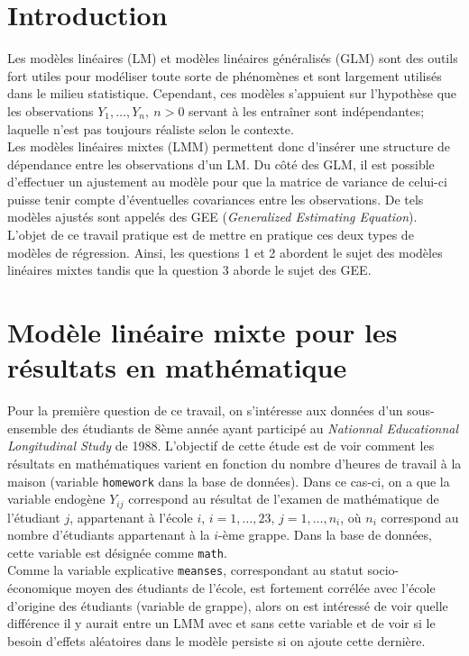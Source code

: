 \documentclass{article}
\begin{document}
\section*{Introduction}
Les modèles linéaires (LM) et modèles linéaires généralisés (GLM) sont des outils fort utiles pour modéliser toute sorte de phénomènes et sont largement utilisés dans le milieu statistique. Cependant, ces modèles s'appuient sur l'hypothèse que les observations $Y_1,\dots,Y_n,\ n>0$ servant à les entraîner sont indépendantes; laquelle n'est pas toujours réaliste selon le contexte.\\

Les modèles linéaires mixtes (LMM) permettent donc d'insérer une structure de dépendance entre les observations d'un LM. Du côté des GLM, il est possible d'effectuer un ajustement au modèle pour que la matrice de variance de celui-ci puisse tenir compte d'éventuelles covariances entre les observations. De tels modèles ajustés sont appelés des GEE (\textit{Generalized Estimating Equation}).\\

L'objet de ce travail pratique est de mettre en pratique ces deux types de modèles de régression. Ainsi, les questions 1 et 2 abordent le sujet des modèles linéaires mixtes tandis que la question 3 aborde le sujet des GEE.


\section{Modèle linéaire mixte pour les résultats en mathématique}\label{sect_qst1}
	Pour la première question de ce travail, on s'intéresse aux données d'un sous-ensemble des étudiants de 8ème année ayant participé au \textit{Nationnal Educationnal Longitudinal Study} de 1988. L'objectif de cette étude est de voir comment les résultats en mathématiques varient en fonction du nombre d'heures de travail à la maison (variable \texttt{homework} dans la base de données).
	Dans ce cas-ci, on a que la variable endogène $Y_{ij}$ correspond au résultat de l'examen de mathématique de l'étudiant $j$, appartenant à l'école $i$, $i=1,\dots, 23$, $j=1,\dots,n_i$, où $n_i$ correspond au nombre d'étudiants appartenant à la $i$-ème grappe. Dans la base de données, cette variable est désignée comme \texttt{math}.\\
	
	Comme la variable explicative \texttt{meanses}, correspondant au statut socio-économique moyen des étudiants de l’école, est fortement corrélée avec l'école d'origine des étudiants (variable de grappe), alors on est intéressé de voir quelle différence il y aurait entre un LMM avec et sans cette variable et de voir si le besoin d'effets aléatoires dans le modèle persiste si on ajoute cette dernière.
\end{document}
